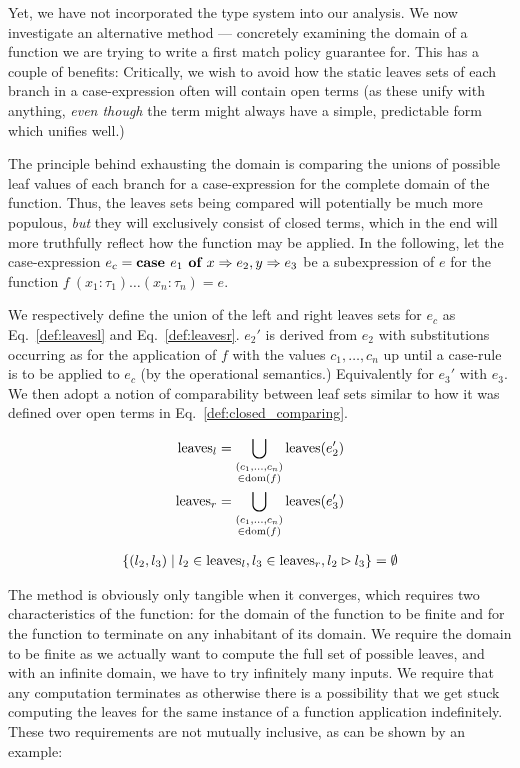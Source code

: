 Yet, we have not incorporated the type system into our analysis. We now
investigate an alternative method --- concretely examining the domain of a
function we are trying to write a first match policy guarantee for. This has a
couple of benefits: Critically, we wish to avoid how the static leaves sets of
each branch in a case-expression often will contain open terms (as these unify
with anything, \emph{even though} the term might always have a simple,
predictable form which unifies well.)

The principle behind exhausting the domain is comparing the unions of possible
leaf values of each branch for a case-expression for the complete domain of the
function. Thus, the leaves sets being compared will potentially be much more
populous, \emph{but} they will exclusively consist of closed terms, which in
the end will more truthfully reflect how the function may be applied. In the
following, let the case-expression $e_c = \textbf{case } e_1 \textbf{ of } x \Rightarrow e_2, y \Rightarrow e_3$ be a
subexpression of $e$ for the function $f~(x_1: \tau_1) \dots (x_n: \tau_n) =
e$.

We respectively define the union of the left and right leaves sets for $e_c$ as
Eq.~\ref{def:leavesl} and Eq.~\ref{def:leavesr}. $e_2'$ is derived from $e_2$
with substitutions occurring as for the application of $f$ with the values
$c_1, \dots, c_n$ up until a case-rule is to be applied to $e_c$ (by the
operational semantics.) Equivalently for $e_3'$ with $e_3$. We then adopt a
notion of comparability between leaf sets similar to how it was defined over
open terms in Eq.~\ref{def:closed_comparing}.

\begin{align}
  \text{leaves}_l = \bigcup_{\substack{(c_1, \dots, c_n) \\ \in \text{dom}{(f)}}} \text{leaves}(e_2')
  \label{def:leavesl} \\
  \text{leaves}_r = \bigcup_{\substack{(c_1, \dots, c_n) \\ \in \text{dom}{(f)}}} \text{leaves}(e_3')
  \label{def:leavesr}
\end{align}

\begin{align}
  \{ (l_2, l_3) \mid l_2 \in \text{leaves}_l
                   , l_3 \in \text{leaves}_r
                   , l_2 \rhd l_3 \}
  = \emptyset
  \label{def:closed_comparing}
\end{align}

The method is obviously only tangible when it converges, which requires two
characteristics of the function: for the domain of the function to be finite
and for the function to terminate on any inhabitant of its domain. We require
the domain to be finite as we actually want to compute the full set of possible
leaves, and with an infinite domain, we have to try infinitely many inputs. We
require that any computation terminates as otherwise there is a possibility
that we get stuck computing the leaves for the same instance of a function
application indefinitely. These two requirements are not mutually inclusive, as
can be shown by an example:

